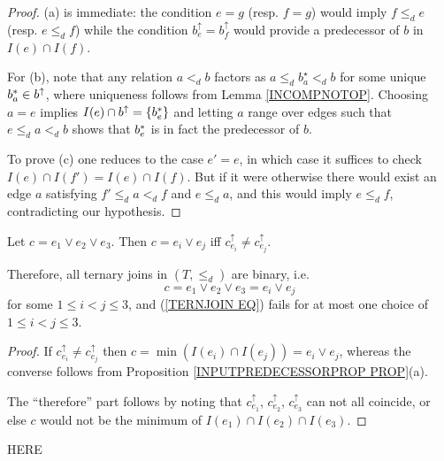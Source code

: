 \documentclass[a4paper,10pt]{article}%
\begin{document}
\begin{proof}
(a) is immediate: the condition $e = g$ (resp. $f = g$) would imply $f \leq_d e$ (resp. $e \leq_d f$)
while the condition $b^{\uparrow}_e = b^{\uparrow}_f$ would provide a predecessor of $b$ in $I(e) \cap I(f)$. 

For (b), note that any relation $a <_d b$ factors as 
$a \leq_d b^{\star}_a <_d b$ for some unique $b^{\**}_a \in b^{\uparrow}$, where uniqueness follows from Lemma \ref{INCOMPNOTOP}. Choosing $a=e$ implies $I(e) \cap b^{\uparrow} = \{b^{\**}_e\}$ and letting $a$ range over edges such that $e \leq_d a <_d b$ shows that $b^{\**}_e$ is in fact the predecessor of $b$.

To prove (c) one reduces to the case $e'=e$, in which case it suffices to check $I(e) \cap I(f') = I(e) \cap I(f)$. But if it were otherwise there would exist an edge $a$ satisfying
$f' \leq_d a <_d f$ and $e \leq_d a$, and this would imply $e \leq_d f$, contradicting our hypothesis.
\end{proof}



\begin{proposition}
\label{TERNARYJOIN PROP}
Let $c = e_1 \vee e_2 \vee e_3$.
Then $c = e_i \vee e_j$ iff $c^{\uparrow}_{e_i} \neq c^{\uparrow}_{e_j}$.

Therefore, all ternary joins in $(T,\leq_d)$ are binary, i.e.
\begin{equation}\label{TERNJOIN EQ}
	c = e_1 \vee e_2 \vee e_3 = e_i \vee e_j
\end{equation}
for some $1\leq i <j \leq 3$, and
(\ref{TERNJOIN EQ}) fails for 
 at most one choice of $1\leq i <j \leq 3$.
\end{proposition}


\begin{proof}
If $c^{\uparrow}_{e_i} \neq c^{\uparrow}_{e_j}$ then
$c = \min\left(I(e_i) \cap I(e_j)\right) = e_i \vee e_j$, whereas the converse follows from Proposition \ref{INPUTPREDECESSORPROP PROP}(a).

The ``therefore'' part follows by noting that 
$c^{\uparrow}_{e_1}$, $c^{\uparrow}_{e_2}$, $c^{\uparrow}_{e_3}$
can not all coincide, or else $c$ would not be the minimum of
$I(e_1) \cap I(e_2) \cap I(e_3)$. 
\end{proof}

{\color{red} HERE}
\end{document}
